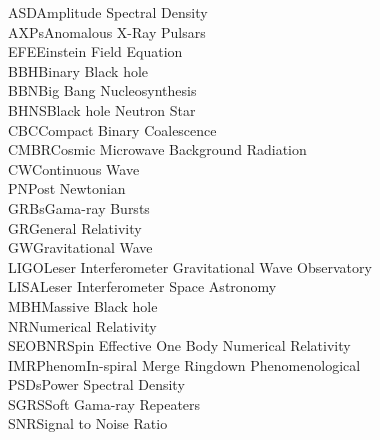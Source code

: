 ASD\hspace{2.4cm}Amplitude Spectral Density\\
AXPs\hspace{2.2cm}Anomalous X-Ray Pulsars\\
EFE\hspace{2.3cm}Einstein Field Equation\\
BBH\hspace{2.3cm}Binary Black hole\\
BBN\hspace{2.3cm}Big Bang Nucleosynthesis\\
BHNS\hspace{2cm}Black hole Neutron Star\\
CBC\hspace{2.3cm}Compact Binary Coalescence\\
CMBR\hspace{1.95cm}Cosmic Microwave Background Radiation\\
CW\hspace{2.55cm}Continuous Wave\\ 
PN\hspace{2.55cm}Post Newtonian\\
GRBs\hspace{2.1cm}Gama-ray Bursts\\
GR\hspace{2.64cm}General Relativity\\
GW\hspace{2.53cm}Gravitational Wave \\
LIGO\hspace{2.2cm}Leser Interferometer Gravitational Wave Observatory\\ 
LISA\hspace{2.3cm}Leser Interferometer Space Astronomy\\
MBH\hspace{2.3cm}Massive Black hole\\
NR\hspace{2.75cm}Numerical Relativity\\
SEOBNR\hspace{1.5cm}Spin Effective One Body Numerical Relativity\\
IMRPhenom\hspace{0.9cm}In-spiral Merge Ringdown Phenomenological\\
PSDs\hspace{2.30cm}Power Spectral Density\\ 
SGRS\hspace{2.2cm}Soft Gama-ray Repeaters\\
SNR\hspace{2.48cm}Signal to Noise Ratio\\  
 


